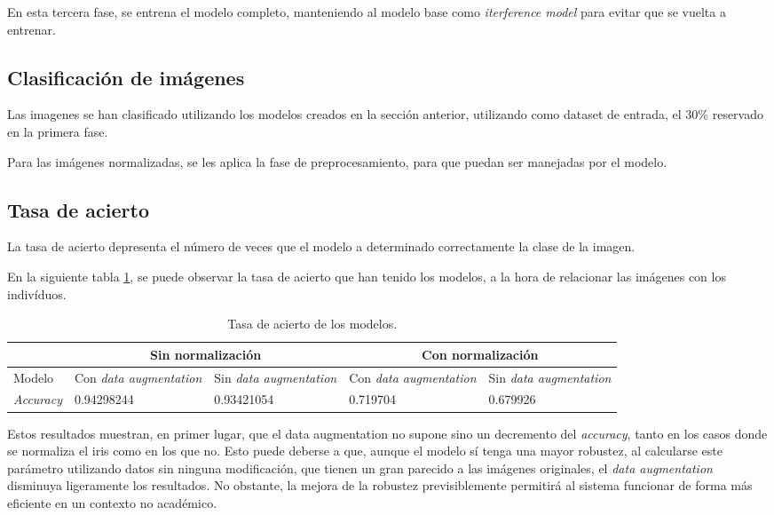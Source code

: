 En esta tercera fase, se entrena el modelo completo, manteniendo al modelo base como \textit{iterference model} para evitar que se vuelta a entrenar.


\subsection{Clasificación de imágenes}

Las imagenes se han clasificado utilizando los modelos creados en la sección anterior, utilizando como dataset de entrada, el 30\% reservado en la primera fase. 

Para las imágenes normalizadas, se les aplica la fase de preprocesamiento, para que puedan ser manejadas por el modelo. 

\subsection{Tasa de acierto} 

La tasa de acierto depresenta el número de veces que el modelo a determinado correctamente la clase de la imagen. 

En la siguiente tabla \ref{tabla:tasa-acierto-modelos}, se puede observar la tasa de acierto que han tenido los modelos, a la hora de relacionar las imágenes
 con los indivíduos.

\begin{table}[h!]
\begin{tabular}{ |p{2cm}||p{2cm}|p{2cm}|p{2cm}|p{2cm}|  }
    \hline
     & \multicolumn{2}{|c|}{Sin normalización} & \multicolumn{2}{|c|}{Con normalización} \\
    \hline
    Modelo& Con \textit{data augmentation} & Sin \textit{data augmentation} &Con \textit{data augmentation}&Sin \textit{data augmentation}\\
    \hline
    \textit{Accuracy} & 0.94298244   & 0.93421054    & 0.719704 &   0.679926\\
    \hline
   \end{tabular}
   \caption{\label{tabla:tasa-acierto-modelos}Tasa de acierto de los modelos.}
\end{table}


Estos resultados muestran, en primer lugar, que el data augmentation no supone sino un decremento del \textit{accuracy}, tanto en los casos donde se normaliza el iris
como en los que no. Esto puede deberse a que, aunque el modelo sí tenga una mayor robustez, al calcularse este parámetro utilizando datos sin ninguna modificación, que 
tienen un gran parecido a las imágenes originales, el \textit{data augmentation} disminuya ligeramente los resultados. No obstante, la mejora de la robustez previsiblemente
permitirá al sistema funcionar de forma más eficiente en un contexto no académico.

